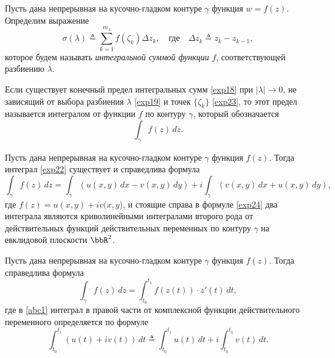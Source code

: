 \begin{defn}
\label{omg}
Пусть дана непрерывная на кусочно-гладком контуре $\gamma$ функция $w=f(z)$. Определим выражение
\begin{equation}
\label{exp18}
\sigma(\lambda) \triangleq \sum\limits_{k=1}^{m_{\lambda}} f(\zeta_k)\Delta z_k, \quad\text{где}\quad \Delta z_k \triangleq z_k - z_{k-1},
\end{equation}
которое будем называть \textit{интегральной суммой функции} $f$, соответствующей разбиению $\lambda$.
\end{defn}

Если существует конечный предел интегральных сумм \eqref{exp18} при $|\lambda| \to 0$, не зависящий от выбора разбиения $\lambda$ \eqref{exp19} и точек $\{\zeta_k\}$ \eqref{exp23}, то этот предел называется интегралом от функции $f$ по контуру $\gamma$, который обозначается
\begin{equation}
\label{exp22}
\int_\gamma f(z)\,dz.
\end{equation}

\begin{thm}
\label{exp21}
Пусть дана непрерывная на кусочно-гладком контуре $\gamma$ функция $f(z)$. Тогда интеграл \eqref{exp22} существует и справедлива формула
\begin{equation}
\label{exp24}
\int _\gamma f(z) \,dz = \int _\gamma(u(x,y)\,dx - v(x,y)\,dy)+i\int_\gamma (v(x,y)\,dx +u(x,y)\,dy),
\end{equation}
где $f(z) = u(x, y)+ iv(x, y$), и стоящие справа в формуле \eqref{exp24} два интеграла являются криволинейными интегралами второго рода от действительных функций действительных переменных по контуру $\gamma$ на евклидовой плоскости $\bbR^2$.
\end{thm}


\begin{cons}
Пусть дана непрерывная на кусочно-гладком контуре $\gamma$ функция $f(z)$. Тогда справедлива формула 
\begin{equation}
\label{abc1}
\int _\gamma f(z) \,dz = \int _{t_0}^{t_1} f(z(t))\cdot z'(t) \,dt,
\end{equation}
где в \eqref{abc1} интеграл в правой части от комплексной функции действительного переменного определяется по формуле
\begin{equation}
\label{kek2}
\int _{t_0}^{t_1}(u(t)+iv(t)) \,dt \triangleq \int _{t_0}^{t_1}u(t) \,dt + i \int _{t_0}^{t_1}v(t) \,dt.
\end{equation}
\end{cons}

